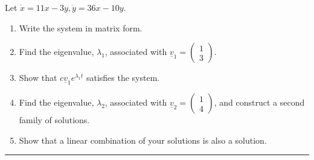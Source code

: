 \documentclass[12pt,letterpaper,noanswers]{exam}
\begin{document}
Let $\dot x = 11x - 3y, \dot y = 36x - 10y$.
\begin{enumerate}
    \item Write the system in matrix form.
    \vspace{0.7in}
    \item Find the eigenvalue, $\lambda_1$, associated with $\underline v_1 = \left(\begin{array}{c} 1 \\ 3\end{array}\right)$.
    \vspace{1in}
    \item Show that $c\underline v_1 e^{\lambda_1 t}$ satisfies the system.
    \vspace{1.5in}
    \item Find the eigenvalue, $\lambda_2$, associated with $\underline v_2 = \left(\begin{array}{c} 1 \\ 4\end{array}\right)$, and construct a second family of solutions.
    \vspace{1in}
    \item Show that a linear combination of your solutions is also a solution.
    \vfill
    
    
\end{enumerate}


\vspace{0.2cm}
\hrule
\vspace{0.2cm}
\end{document}
